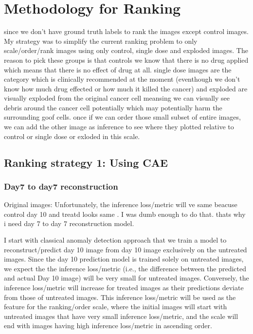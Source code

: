 \chapter{Methodology for Ranking}\label{ch:Methodology for Ranking}
 
since we don't have ground truth labels to rank the images except control images.
My strategy was to simplify the current ranking problem to only scale/order/rank images 
using only control, single dose and exploded images.
The reason to pick these groups is that controls we know that there is no drug applied which means that there is no effect of drug at all. 
single dose images are the category which is clinically recommended at the moment (eventhough we don't know how much drug effected or how 
much it killed the cancer) 
and exploded are visually exploded from the original cancer cell meansing we can visually see debris around the cancer cell potentially which
 may potentially harm the surrounding goof cells.
once if we can order those small subset of entire images, we can add the other image as inference to see where they plotted relative to 
control 
or single dose or exloded in this scale.

\section{Ranking strategy 1: Using CAE}

\subsection{Day7 to day7 reconstruction}
Original images: Unfortunately, the inference loss/metric will ve same beacuse control day 10 and treatd looks same . I was dumb enough to do that.
 thats why i need  day 7 to day 7 reconstruction model.



I start with classical anomaly detection approach that we train a model to 
reconstruct/predict day 10 image from day 10 image exclusively on the untreated images. Since the day 10 prediction model is trained solely on untreated images,
 we expect the the inference loss/metric (i.e., the difference between the predicted and actual Day 10 image) will be very small for untreated images.
Conversely, the inference loss/metric will increase for treated images as their predictions deviate from those of untreated images.
 This inference loss/metric will be used as the feature for the ranking/order scale, where the initial images will start 
 with untreated images that have very small inference loss/metric, and the scale will end with images having high inference loss/metric in ascending order.


